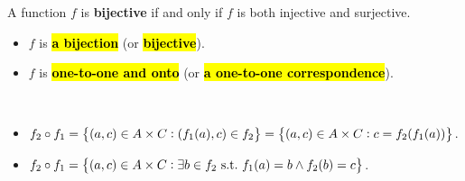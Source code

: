 \documentclass[11pt,openany]{article}
\begin{document}
\begin{remark*}
	A function $f$ is \textbf{bijective} if and only if $f$ is both injective and surjective.
	\begin{itemize}
		\item $f$ is \hl{\textbf{a bijection}} (or \hl{\textbf{bijective}}).
		\item $f$ is \hl{\textbf{one-to-one and onto}} (or \hl{\textbf{a one-to-one correspondence}}).
	\end{itemize}
\end{remark*}

\newpage
{}
\begin{remark*}
\ \begin{itemize}
	\item $f_2\circ f_1=\set{(a,c)\in A\times C: (f_1(a), c)\in f_2}=\set{(a,c)\in A\times C: c=f_2(f_1(a))}$.
	\item $f_2\circ f_1=\set{(a,c)\in A\times C: \exists b\in f_2\ \text{s.t.}\ f_1(a)=b\land f_2(b)=c}$.
\end{itemize}
\end{remark*}
\vfill
\begin{note}[Diagram]
\ \begin{figure}[h!]
	\centering
\end{figure}
\end{note}
\vfill
\end{document}
